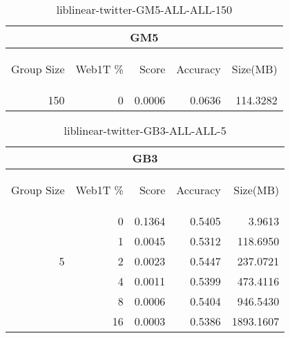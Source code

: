 \begin{center}
\begin{table}[htbp]
\begin{tabular}{ | r | r | r | r | r |}
\hline
\multicolumn{5}{|c|}{GM5}\\
\hline
\begin{sideways}Group Size\end{sideways} & \begin{sideways}Web1T \%\end{sideways} & \begin{sideways}Score\end{sideways} & \begin{sideways}Accuracy\end{sideways} & \begin{sideways}Size(MB)\end{sideways}\\
\hline
\multirow{0}{*}{150}
 & 0 & 0.0006 & 0.0636 & 114.3282\\ \cline{2-5}
\hline
\end{tabular}
\caption{liblinear-twitter-GM5-ALL-ALL-150}
\label{table:liblinear-twitter-GM5-ALL-ALL-150}
\end{table}
\end{center}

\begin{center}
\begin{table}[htbp]
\begin{tabular}{ | r | r | r | r | r |}
\hline
\multicolumn{5}{|c|}{GB3}\\
\hline
\begin{sideways}Group Size\end{sideways} & \begin{sideways}Web1T \%\end{sideways} & \begin{sideways}Score\end{sideways} & \begin{sideways}Accuracy\end{sideways} & \begin{sideways}Size(MB)\end{sideways}\\
\hline
\multirow{5}{*}{5}
 & 0 & 0.1364 & 0.5405 & 3.9613\\ \cline{2-5}
 & 1 & 0.0045 & 0.5312 & 118.6950\\ \cline{2-5}
 & 2 & 0.0023 & 0.5447 & 237.0721\\ \cline{2-5}
 & 4 & 0.0011 & 0.5399 & 473.4116\\ \cline{2-5}
 & 8 & 0.0006 & 0.5404 & 946.5430\\ \cline{2-5}
 & 16 & 0.0003 & 0.5386 & 1893.1607\\ \cline{2-5}
\hline
\end{tabular}
\caption{liblinear-twitter-GB3-ALL-ALL-5}
\label{table:liblinear-twitter-GB3-ALL-ALL-5}
\end{table}
\end{center}

